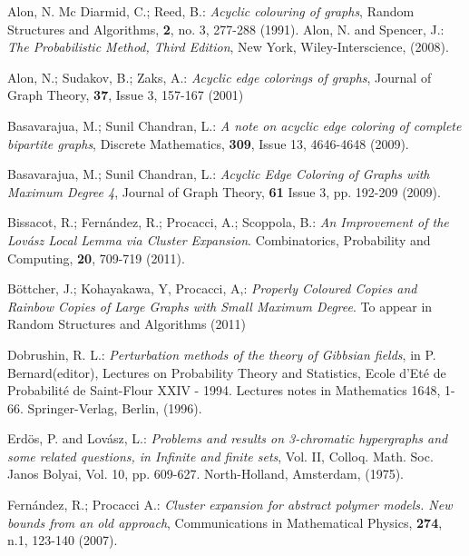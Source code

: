 \documentclass[11pt]{article}
\begin{document}
\begin{thebibliography}{99}
\small{

 Alon, N. Mc Diarmid, C.; Reed, B.: {\it  Acyclic colouring of graphs}, Random Structures and Algorithms, {\bf 2}, no. 3, 277-288 (1991).
 Alon, N. and Spencer, J.: {\it The Probabilistic Method,
Third  Edition}, New York, Wiley-Interscience, (2008).

 Alon, N.; Sudakov, B.; Zaks, A.: {\it Acyclic edge colorings of graphs}, Journal of Graph Theory, {\bf 37}, Issue 3, 157-167 (2001)


 Basavarajua, M.; Sunil Chandran, L.: {\it A note on acyclic edge coloring of complete bipartite graphs}, Discrete Mathematics,
{\bf 309}, Issue 13, 4646-4648 (2009).

 Basavarajua, M.; Sunil Chandran, L.: {\it Acyclic Edge Coloring of Graphs with Maximum Degree 4}, Journal of Graph Theory,
{\bf 61} Issue 3, pp. 192-209 (2009).

 Bissacot, R.; Fern\'andez, R.; Procacci, A.;  Scoppola, B.:
{\it An Improvement of the Lov\'asz Local Lemma via Cluster Expansion}.
Combinatorics, Probability and Computing, {\bf 20}, 709-719 (2011).

 B\"{o}ttcher, J.;  Kohayakawa, Y,  Procacci, A,: {\it Properly Coloured Copies and Rainbow
Copies of Large Graphs with Small
Maximum Degree}. To appear in Random Structures and Algorithms (2011)

 Dobrushin, R. L.: {\it Perturbation methods of the theory of
Gibbsian fields}, in P. Bernard(editor), Lectures on Probability
Theory and Statistics, Ecole d'Et\'e de Probabilit\'e de Saint-Flour
XXIV - 1994. Lectures notes in Mathematics 1648, 1-66.
Springer-Verlag, Berlin, (1996).

 Erd\"{o}s, P. and Lov\'{a}sz, L.: {\it Problems and results on 3-chromatic
hypergraphs and some related questions, in Infinite and finite
sets}, Vol. II, Colloq. Math. Soc. Janos Bolyai, Vol. 10, pp. 609-627.
North-Holland, Amsterdam, (1975).





 Fern\'andez, R.; Procacci A.: {\it Cluster
expansion for abstract polymer models. New bounds from an old
approach},  Communications in Mathematical Physics, {\bf 274}, n.1,
123-140 (2007).

}
\end{thebibliography}
\end{document}
